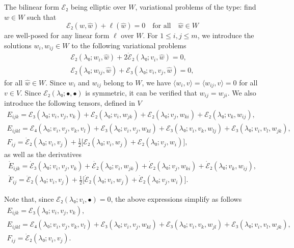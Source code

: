 \documentclass[12pt, final]{scrartcl}
\theoremstyle{definition}
\begin{document}
The bilinear form \(ℰ₂\) being elliptic over \(W\), variational problems of the
type: find \(w ∈ W\) such that
\begin{equation}
  ℰ₂(w, \hat{w})+\ell(\hat{w}) = 0 \quad \text{for all} \quad \hat{w}∈W
\end{equation}
are well-posed for any linear form \(\ell\) over \(W\). For \(1 ≤ i, j ≤ m\), we
introduce the solutions \(w_i, w_{ij} ∈ W\) to the following variational
problems
\begin{gather}
  \label{eq:20220524134525}
  ℰ₂(λ₀; w_i, \hat{w}) + 2\dot{ℰ}₂(λ₀; v_i, \hat{w}) = 0,\\
  \label{eq:20220519164523}
  ℰ₂(λ₀; w_{i j}, \hat{w})+ℰ₃(λ₀; v_i, v_j, \hat{w}) = 0,
\end{gather}
for all \(\hat{w} ∈ W\). Since \(w_{i}\) and \(w_{ij}\) belong to \(W\), we have
\(〈 w_{i}, v 〉 = 〈 w_{ij}, v 〉 = 0\) for all \(v ∈ V\). Since \(ℰ₂(λ₀; •,
•)\) is symmetric, it can be verified that \(w_{ij}=w_{ji}\). We also introduce
the following tensors, defined in \(V\)
\begin{gather}
  E_{ijk} = ℰ₃(λ₀; v_i, v_j, v_k) + ℰ₂(λ₀; v_i, w_{jk}) + ℰ₂(λ₀; v_j, w_{ki}) + ℰ₂(λ₀; v_k, w_{ij}),\\
  E_{ijkl} = ℰ₄(λ₀ ; v_i, v_j, v_k, v_l) + ℰ₃(λ₀ ; v_i, v_j, w_{kl}) + ℰ₃(λ₀ ; v_i, v_k, w_{lj}) + ℰ₃(λ₀ ; v_i, v_l, w_{jk}),\\
  F_{ij} = \dot{ℰ}₂(λ₀; v_i, v_j) + \tfrac{1}{2} \bigl[ℰ₂(λ₀; v_i, w_j) + ℰ₂(λ₀; v_j, w_i)\bigr],
\end{gather}
as well as the derivatives
\begin{gather}
  \mathring{E}_{ijk} = \dot{ℰ}₃(λ₀; v_i, v_j, v_k) + \dot{ℰ₂}(λ₀; v_i, w_{jk}) + \dot{ℰ}₂(λ₀; v_j, w_{ki}) + \dot{ℰ}₂(λ₀; v_k, w_{ij}),\\
  \mathring{F}_{ij} = \ddot{ℰ}₂(λ₀; v_i, v_j) + \tfrac{1}{2} \bigl[\dot{ℰ}₂(λ₀; v_i, w_j) + \dot{ℰ}₂(λ₀; v_j, w_i)\bigr].
\end{gather}

Note that, since \(ℰ₂(λ₀; v_i, •) = 0\), the above expressions simplify as follows
\begin{gather}
  \label{eq:20220524135619}
  E_{ijk} = ℰ₃(λ₀; v_i, v_j, v_k),\\
  \label{eq:20220524135553}
  E_{ijkl} = ℰ₄(λ₀ ; v_i, v_j, v_k, v_l) + ℰ₃(λ₀ ; v_i, v_j, w_{kl}) + ℰ₃(λ₀ ; v_i, v_k, w_{jl}) + ℰ₃(λ₀ ; v_i, v_l, w_{jk}),\\
  \label{eq:20220524135643}
  F_{ij} = \dot{ℰ}₂(λ₀; v_i, v_j).
\end{gather}
\end{document}
